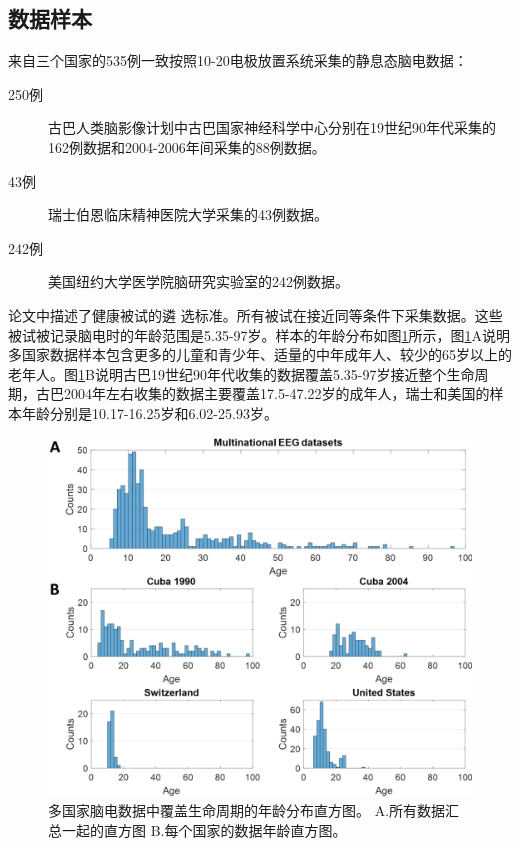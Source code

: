 \subsection{数据样本}
来自三个国家的535例一致按照10-20电极放置系统采集的静息态脑电数据：
\begin{description}
\item[250例] 古巴人类脑影像计划中古巴国家神经科学中心分别在19世纪90年代采集的162例数据和2004-2006年间采集的88例数据。
\item[43例] 瑞士伯恩临床精神医院大学采集的43例数据。
\item[242例] 美国纽约大学医学院脑研究实验室的242例数据。
\end{description}
论文\cite{john1977neurometrics,alvarez1987eeg,koenig2002millisecond,hernandez-gonzalez_multimodal_2011}中描述了健康被试的遴
选标准。所有被试在接近同等条件下采集数据。这些被试被记录脑电时的年龄范围是5.35-97岁。样本的年龄分布如图\ref{6:age}所示，图\ref{6:age}A说明多国家数据样本包含更多的儿童和青少年、适量的中年成年人、较少的65岁以上的老年人。图\ref{6:age}B说明古巴19世纪90年代收集的数据覆盖5.35-97岁接近整个生命周期，古巴2004年左右收集的数据主要覆盖17.5-47.22岁的成年人，瑞士和美国的样本年龄分别是10.17-16.25岁和6.02-25.93岁。
\begin{figure}[!ht]
\includegraphics[width=15cm]{pic/Norm/figure1.png}
\caption{多国家脑电数据中覆盖生命周期的年龄分布直方图。 A.所有数据汇总一起的直方图 B.每个国家的数据年龄直方图。}
\label{6:age}
\end{figure}

